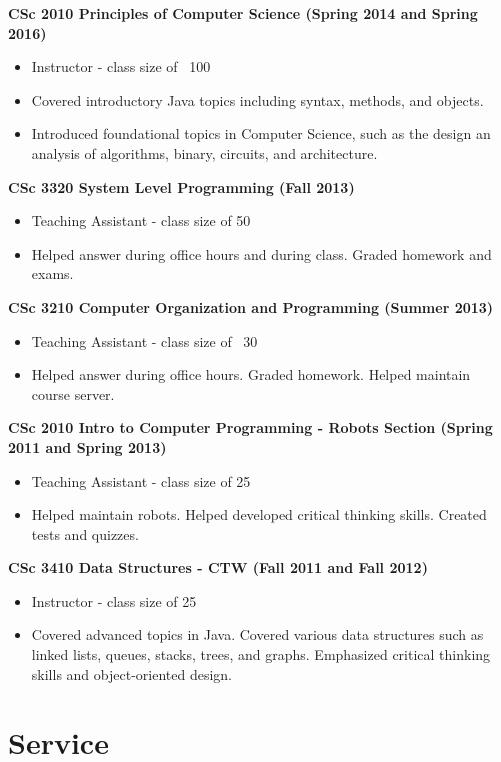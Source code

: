 \documentclass{res}
\begin{document}
\begin{resume}
{\bf CSc 2010 Principles of Computer Science (Spring 2014 and Spring 2016) }
\begin{itemize}
	\item Instructor - class size of ~100
	\item Covered introductory Java topics including syntax, methods, and objects.
	\item Introduced foundational topics in Computer Science, such as the design an analysis of algorithms, binary, circuits, and architecture.
\end{itemize}


{\bf CSc 3320  System Level Programming (Fall 2013)}
    \begin{itemize}
    \item Teaching Assistant - class size of 50
      \item Helped answer during office hours and during class.  Graded homework and exams.  
    \end{itemize}


{\bf CSc 3210 Computer Organization and Programming (Summer 2013)}
    \begin{itemize}
    \item Teaching Assistant - class size of ~30
      \item Helped answer during office hours.  Graded homework.  Helped maintain course server.
    \end{itemize}



{\bf CSc 2010 Intro to Computer Programming - Robots Section (Spring 2011 and Spring 2013) }
    \begin{itemize}
      \item Teaching Assistant - class size of 25
      \item Helped maintain robots.  Helped developed critical thinking skills.  Created tests and quizzes.
    \end{itemize}


{\bf CSc 3410 Data Structures  - CTW (Fall 2011 and  Fall 2012) }
    \begin{itemize}
    \item Instructor - class size of 25
      \item Covered advanced topics in Java.  Covered various data structures such as linked lists, queues, stacks, trees, and graphs.  Emphasized critical thinking skills and object-oriented design.
    \end{itemize}

\newpage
\section{Service}



\end{resume}
\end{document}
